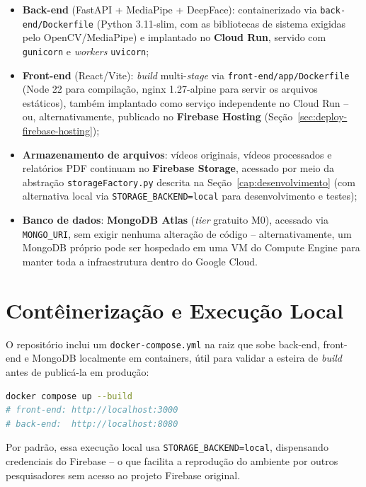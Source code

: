 \documentclass[
	12pt,
	openright,
	oneside,
	a4paper,
	english,
	brazil
	]{abntex2}
\begin{document}
\begin{apendicesenv}
\begin{itemize}
    \item \textbf{Back-end} (FastAPI + MediaPipe + DeepFace): containerizado via \texttt{back-end/Dockerfile} (Python 3.11-slim, com as bibliotecas de sistema exigidas pelo OpenCV/MediaPipe) e implantado no \textbf{Cloud Run}, servido com \texttt{gunicorn} e \textit{workers} \texttt{uvicorn};
    \item \textbf{Front-end} (React/Vite): \textit{build} multi-\textit{stage} via \texttt{front-end/app/Dockerfile} (Node 22 para compilação, nginx 1.27-alpine para servir os arquivos estáticos), também implantado como serviço independente no Cloud Run -- ou, alternativamente, publicado no \textbf{Firebase Hosting} (Seção~\ref{sec:deploy-firebase-hosting});
    \item \textbf{Armazenamento de arquivos}: vídeos originais, vídeos processados e relatórios PDF continuam no \textbf{Firebase Storage}, acessado por meio da abstração \texttt{storageFactory.py} descrita na Seção~\ref{cap:desenvolvimento} (com alternativa local via \texttt{STORAGE\_BACKEND=local} para desenvolvimento e testes);
    \item \textbf{Banco de dados}: \textbf{MongoDB Atlas} (\textit{tier} gratuito M0), acessado via \texttt{MONGO\_URI}, sem exigir nenhuma alteração de código -- alternativamente, um MongoDB próprio pode ser hospedado em uma VM do Compute Engine para manter toda a infraestrutura dentro do Google Cloud.
\end{itemize}

\section{Contêinerização e Execução Local}

O repositório inclui um \texttt{docker-compose.yml} na raiz que sobe back-end, front-end e MongoDB localmente em containers, útil para validar a esteira de \textit{build} antes de publicá-la em produção:

\begin{lstlisting}[language=bash, caption={Execução local com Docker Compose}]
docker compose up --build
# front-end: http://localhost:3000
# back-end:  http://localhost:8080
\end{lstlisting}

Por padrão, essa execução local usa \texttt{STORAGE\_BACKEND=local}, dispensando credenciais do Firebase -- o que facilita a reprodução do ambiente por outros pesquisadores sem acesso ao projeto Firebase original.


\end{apendicesenv}
\end{document}
